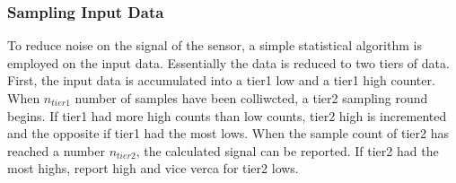 \subsubsection{Sampling Input Data}

To reduce noise on the signal of the sensor, a simple statistical algorithm is
employed on the input data. Essentially the data is reduced to two tiers
of data. First, the input data is accumulated into a tier1 low and a tier1 high
counter. When $n_{tier1}$ number of samples have been colliwcted, a tier2 sampling round begins. If tier1
had more high counts than low counts, tier2 high is incremented and the opposite if
tier1 had the most lows. When the sample count of tier2 has reached a number
$n_{tier2}$, the calculated signal can be reported. If tier2 had the most highs,
report high and vice verca for tier2 lows.


